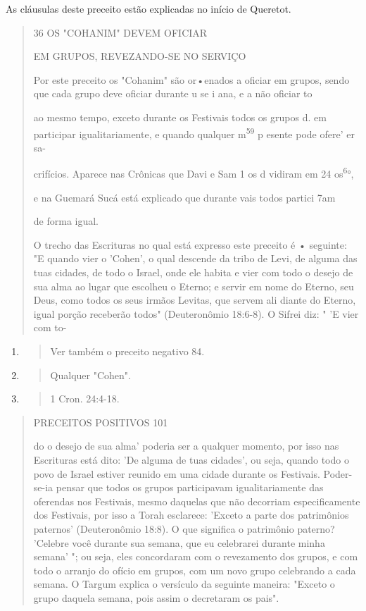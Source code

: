 As cláusulas deste preceito estão explicadas no início de Queretot.

\begin{quote}
36 OS "COHANIM" DEVEM OFICIAR

EM GRUPOS, REVEZANDO-SE NO SERVIÇO

Por este preceito os "Cohanim" são or•enados a oficiar em grupos, sendo
que cada grupo deve oficiar durante u se i ana, e a não oficiar to

ao mesmo tempo, exceto durante os Festivais todos os grupos d. em\\
participar igualitariamente, e quando qualquer m\textsuperscript{59} p
esente pode ofere' er sa-

crifícios. Aparece nas Crônicas que Davi e Sam 1 os d vidiram em 24
os\textsuperscript{6}°,

e na Guemará Sucá está explicado que durante vais todos partici 7am

de forma igual.

O trecho das Escrituras no qual está expresso este preceito é •
se­guinte: "E quando vier o 'Cohen', o qual descende da tribo de Levi,
de alguma das tuas cidades, de todo o Israel, onde ele habita e vier com
todo o desejo de sua alma ao lugar que escolheu o Eterno; e servir em
nome do Eterno, seu Deus, como todos os seus irmãos Levitas, que servem
ali diante do Eterno, igual porção receberão todos" (Deuteronômio
18:6-8). O Sifrei diz: " 'E vier com to-
\end{quote}

\begin{enumerate}
\def\labelenumi{\arabic{enumi}.}
\setcounter{enumi}{57}
\item
  \begin{quote}
  Ver também o preceito negativo 84.
  \end{quote}
\item
  \begin{quote}
  Qualquer "Cohen".
  \end{quote}
\item
  \begin{quote}
  1 Cron. 24:4-18.
  \end{quote}
\end{enumerate}

\begin{quote}
PRECEITOS POSITIVOS 101

do o desejo de sua alma' poderia ser a qualquer momento, por isso nas
Escritu­ras está dito: 'De alguma de tuas cidades', ou seja, quando todo
o povo de Is­rael estiver reunido em uma cidade durante os Festivais.
Poder-se-ia pensar que todos os grupos participavam igualitariamente das
oferendas nos Festivais, mes­mo daquelas que não decorriam
especificamente dos Festivais, por isso a To­rah esclarece: 'Exceto a
parte dos patrimônios paternos' (Deuteronômio 18:8). O que significa o
patrimônio paterno? 'Celebre você durante sua semana, que eu celebrarei
durante minha semana' "; ou seja, eles concordaram com o reve­zamento
dos grupos, e com todo o arranjo do ofício em grupos, com um novo grupo
celebrando a cada semana. O Targum explica o versículo da seguinte
ma­neira: "Exceto o grupo daquela semana, pois assim o decretaram os
pais".
\end{quote}

